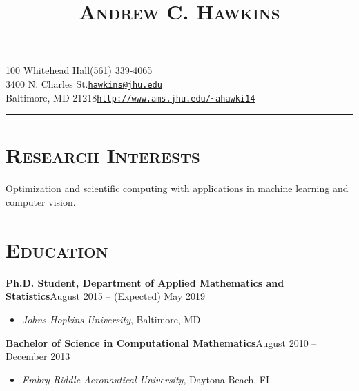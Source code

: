 \documentclass[10pt]{article}
\title{\textsc{\textbf{Andrew C. Hawkins}}\vspace{-13.7ex}}
\date{}
\author{}
\begin{document}
\maketitle

\section*{}
100 Whitehead Hall\hfill (561) 339-4065\\
3400 N. Charles St.\hfill \texttt{\href{mailto:hawkins@jhu.edu}{hawkins@jhu.edu}}\\
Baltimore, MD 21218\hfill \texttt{\url{http://www.ams.jhu.edu/~ahawki14}}

\noindent\rule{\textwidth}{1pt}

\section*{\textsc{Research Interests}}
Optimization and scientific computing with applications in machine learning and computer vision.

\section*{\textsc{Education}}
\textbf{Ph.D. Student, Department of Applied Mathematics and Statistics}\hfill August 2015 -- (Expected) May 2019
\begin{itemize}[noitemsep]
    \item[] \textit{Johns Hopkins University}, Baltimore, MD
\end{itemize}
\vspace{2ex}
\textbf{Bachelor of Science in Computational Mathematics}\hfill August 2010 -- December 2013
\begin{itemize}[noitemsep]
    \item[] \textit{Embry-Riddle Aeronautical University}, Daytona Beach, FL
\end{itemize}
\end{document}
